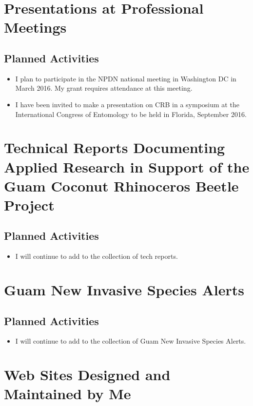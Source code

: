 \documentclass[12pt,oneside,english]{scrbook}
\begin{document}
\section{Presentations at Professional Meetings}
\subsection{Planned Activities}
\begin{itemize}
\item I plan to participate in the NPDN national meeting in Washington DC in March 2016. My grant requires attendance at this meeting.
\item I have been invited to make a presentation on CRB in a symposium at the International Congress of Entomology to be held in Florida, September 2016.
\end{itemize}

\section{Technical Reports Documenting Applied Research in Support of the
Guam Coconut Rhinoceros Beetle Project}
\subsection{Planned Activities}
\begin{itemize}
\item I will continue to add to the collection of tech reports.
\end{itemize}

\section{Guam New Invasive Species Alerts} 
\label{Guam New Invasive Species Alerts}
\subsection{Planned Activities}
\begin{itemize}
\item I will continue to add to the collection of Guam New Invasive Species Alerts.
\end{itemize}

\section{\label{sec:Web-Sites-Designed}Web Sites Designed and Maintained by Me}
\end{document}
